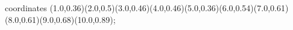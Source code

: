 					coordinates { (1.0,0.36)(2.0,0.5)(3.0,0.46)(4.0,0.46)(5.0,0.36)(6.0,0.54)(7.0,0.61)(8.0,0.61)(9.0,0.68)(10.0,0.89)};
